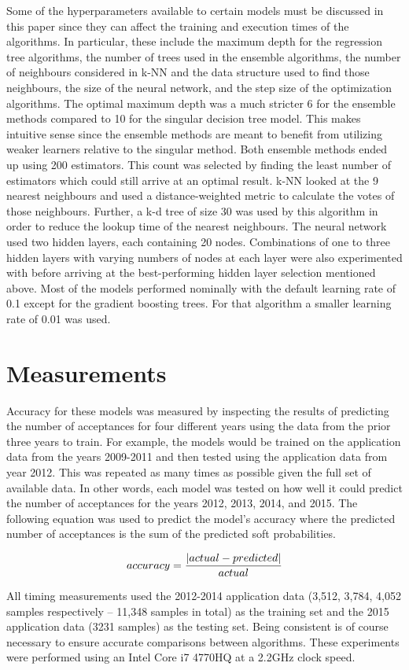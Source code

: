 Some of the hyperparameters available to certain models must be discussed in this paper since they can affect the training and execution times of the algorithms. In particular, these include the maximum depth for the regression tree algorithms, the number of trees used in the ensemble algorithms, the number of neighbours considered in k-NN and the data structure used to find those neighbours, the size of the neural network, and the step size of the optimization algorithms. The optimal maximum depth was a much stricter 6 for the ensemble methods compared to 10 for the singular decision tree model. This makes intuitive sense since the ensemble methods are meant to benefit from utilizing weaker learners relative to the singular method. Both ensemble methods ended up using 200 estimators. This count was selected by finding the least number of estimators which could still arrive at an optimal result. k-NN looked at the 9 nearest neighbours and used a distance-weighted metric to calculate the votes of those neighbours. Further, a k-d tree of size 30 was used by this algorithm in order to reduce the lookup time of the nearest neighbours. The neural network used two hidden layers, each containing 20 nodes. Combinations of one to three hidden layers with varying numbers of nodes at each layer were also experimented with before arriving at the best-performing hidden layer selection mentioned above. Most of the models performed nominally with the default learning rate of 0.1 except for the gradient boosting trees. For that algorithm a smaller learning rate of 0.01 was used.



\section{Measurements}
Accuracy for these models was measured by inspecting the results of predicting the number of acceptances for four different years using the data from the prior three years to train. For example, the models would be trained on the application data from the years 2009-2011 and then tested using the application data from year 2012. This was repeated as many times as possible given the full set of available data. In other words, each model was tested on how well it could predict the number of acceptances for the years 2012, 2013, 2014, and 2015. The following equation was used to predict the model's accuracy where the predicted number of acceptances is the sum of the predicted soft probabilities.

$$accuracy = \frac{\lvert actual-predicted \rvert}{actual}$$

All timing measurements used the 2012-2014 application data (3,512, 3,784, 4,052 samples respectively -- 11,348 samples in total) as the training set and the 2015 application data (3231 samples) as the testing set. Being consistent is of course necessary to ensure accurate comparisons between algorithms. These experiments were performed using an Intel Core i7 4770HQ at a 2.2GHz clock speed.